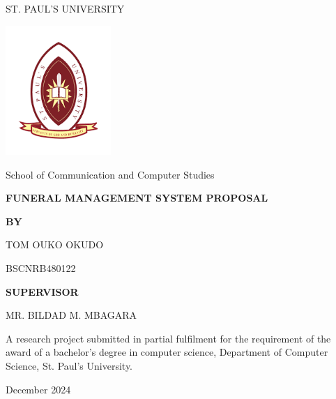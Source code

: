 \documentclass[a4paper,12pt]{report}
\begin{document}
\begin{titlepage}
    \centering
    {\LARGE ST. PAUL’S UNIVERSITY \par}
    \vspace{0.5cm}
    
    \includegraphics[width=0.3\textwidth]{../img/logo.png} %
    
    \vspace{0.5cm}
    {\LARGE School of Communication and Computer Studies \par}
    \vspace{1.5cm}
    
    {\Huge \textbf{FUNERAL MANAGEMENT SYSTEM PROPOSAL} \par}
    \vspace{1.8cm}
    
    {\Large \textbf{BY} \par}
    \vspace{0.2cm}
    {\Large TOM OUKO OKUDO \par}
    {\Large BSCNRB480122 \par}
    \vspace{1.5cm}


     {\Large \textbf{SUPERVISOR} \par}
     \vspace{0.2cm}
     {\Large MR. BILDAD M. MBAGARA \par}
     \vspace{1.4cm}
    
    
    {\large A research project submitted in partial fulfilment for the requirement of the award of a bachelor’s degree in computer science, Department of Computer Science, St. Paul’s University. \par}
    \vspace{1.4cm}
    
    {\large December 2024 \par}
\end{titlepage}
\end{document}
